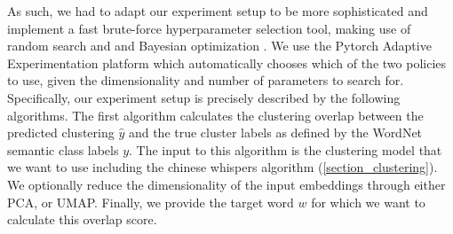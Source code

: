\documentclass[a4paper,12pt,twoside,openright]{report}
\begin{document}
As such, we had to adapt our experiment setup to be more sophisticated and implement a fast brute-force hyperparameter selection tool, making use of random search and \cite{bergstra12} and Bayesian optimization \cite{wang13}.
We use the Pytorch Adaptive Experimentation platform \cite{pyax} which automatically chooses which of the two policies to use, given the dimensionality and number of parameters to search for.
Specifically, our experiment setup is precisely described by the following algorithms.
The first algorithm calculates the clustering overlap between the predicted clustering $\hat{y}$ and the true cluster labels as defined by the WordNet semantic class labels $y$.
The input to this algorithm is the clustering model that we want to use including the chinese whispers algorithm (\ref{section_clustering}). 
We optionally reduce the dimensionality of the input embeddings through either PCA, or UMAP.
Finally, we provide the target word $w$ for which we want to calculate this overlap score.
\end{document}
